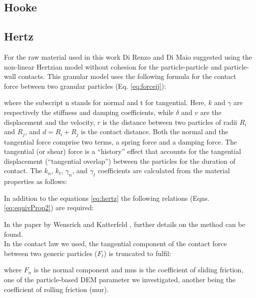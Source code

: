 \subsection{Hooke}
\label{subsec:hooke}

\subsection{Hertz}
\label{subsec:hertz}

For the raw material used in this work 
Di Renzo and Di Maio \cite{RefWorks:145} suggested using the non-linear
Hertzian model without cohesion for the particle-particle and particle-wall contacts. 
This granular model uses the following formula for the contact force between two granular particles (Eq. \ref{eq:forceij}):

where the subscript \acs{n} stands for normal and \acs{t} for tangential. 
Here, $k$ and $\gamma$ are respectively the stiffness and damping coefficients, 
while $\delta$ and $v$ are the displacement and the velocity, $r$ is the
distance between two particles of radii $R_i$ and $R_j$, and $d = R_i + R_j $ is
the contact distance.
Both the normal and the tangential
force comprise two terms, a spring force and a damping force. 
The tangential (or shear) force is a ``history'' effect that accounts for the
tangential displacement (``tangential overlap'') between the particles for the
duration of contact.
The $k_n$, $k_t$, $\gamma_n$, and $\gamma_t$ coefficients are calculated from
the material properties as follows:

In addition to the equations \ref{eq:hertz} the following relations (Eqns. \ref{eq:equivProp2}) are required:


In the paper by Wensrich and Katterfeld \cite{RefWorks:87}, further details on
the method can be found.\\
In the contact law we used, 
the tangential component of the contact force between two generic particles
($F_t$) is truncated to fulfil:


where $F_n$ is the normal component and \acs{mus} is the coefficient of sliding
friction, one of the particle-based \acs{DEM} parameter we investigated, 
another being the coefficient of rolling friction (\acs{mur}). 


